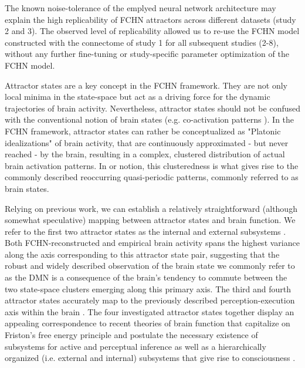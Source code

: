 \documentclass{article}
\begin{document}
The known noise-tolerance of the emplyed neural network architecture may explain the high replicability of FCHN attractors across different datasets (study 2 and 3). The observed level of replicability allowed us to re-use the FCHN model constructed with the connectome of study 1 for all subsequent studies (2-8), without any further fine-tuning or study-specific parameter optimization of the FCHN model.

Attractor states are a key concept in the FCHN framework. They are not only local minima in the state-space but act as a driving force for the dynamic trajectories of brain activity. Nevertheless, attractor states should not be confused with the conventional notion of brain states (e.g. co-activation patterns \citep{chen2015introducing}). In the FCHN framework, attractor states can rather be conceptualized as "Platonic idealizations" of brain activity, that are continuously approximated - but never reached - by the brain, resulting in a complex, clustered distribution of actual brain activation patterns. In or notion, this clusteredness is what gives rise to the commonly described reoccurring quasi-periodic patterns, commonly referred to as brain states.

Relying on previous work, we can establish a relatively straightforward (although somewhat speculative) mapping between attractor states and brain function. We refer to the first two attractor states as the internal and external subsystems \citep{golland2008data, cioli2014differences}. Both FCHN-reconstructed and empirical brain activity spans the highest variance along the axis corresponding to this attractor state pair, suggesting that the robust and widely described observation of the brain state we commonly refer to as the DMN is a consequence of the brain's tendency to commute between the two state-space clusters emerging along this primary axis.
The third and fourth attractor states accurately map to the previously described perception-execution axis within the brain \citep{fuster2004upper}. The four investigated attractor states together display an appealing correspondence to recent theories of brain function that capitalize on Friston's free energy principle \citep{friston2006free} and postulate the necessary existence of subsystems for active and perceptual inference \citep{friston2023free} as well as a hierarchically organized (i.e. external and internal) subsystems that give rise to consciousness \citep{ramstead2023inner}.
\end{document}
